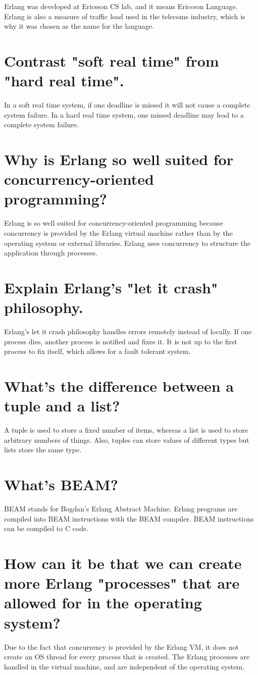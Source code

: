 \documentclass{article}
\begin{document}
\noindent
Erlang was developed at Ericsson CS lab, and it means Ericcson Language. Erlang is also a measure of traffic load used in the telecoms industry, which is why it was chosen as the name for the language. 

\section{Contrast "soft real time" from "hard real time".}

\noindent
In a soft real time system, if one deadline is missed it will not cause a complete system failure. In a hard real time system, one missed deadline may lead to a complete system failure. 

\section{Why is Erlang so well suited for concurrency-oriented programming?}

\noindent
Erlang is so well suited for concurrency-oriented programming because concurrency is provided by the Erlang virtual machine rather than by the operating system or external libraries. Erlang uses concurrency to structure the application through processes. 

\section{Explain Erlang's "let it crash" philosophy.}

\noindent
Erlang's let it crash philosophy handles errors remotely instead of locally. If one process dies, another process is notified and fixes it. It is not up to the first process to fix itself, which allows for a fault tolerant system. 

\section{What's the difference between a tuple and a list?}

\noindent
A tuple is used to store a fixed number of items, whereas a list is used to store arbitrary numbers of things. Also, tuples can store values of different types but lists store the same type. 

\section{What's BEAM?}

\noindent
BEAM stands for Bogdan's Erlang Abstract Machine. Erlang programs are compiled into BEAM instructions with the BEAM compiler. BEAM instructions can be compiled to C code. 

\section{How can it be that we can create more Erlang "processes" that are allowed for in the operating system?}

\noindent
Due to the fact that concurrency is provided by the Erlang VM, it does not create an OS thread for every process that is created. The Erlang processes are handled in the virtual machine, and are independent of the operating system. 
\end{document}
